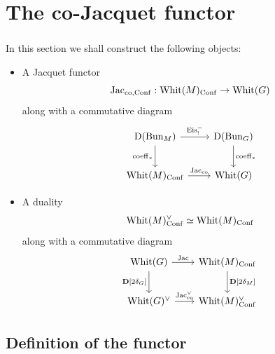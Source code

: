 \section{The co-Jacquet functor}
\label{section:co_Jac}

\subsubsection{} In this section we shall construct the following objects:
\begin{itemize}
    \item A Jacquet functor
        \[\mathrm{Jac}_{\mathrm{co},\mathrm{Conf}} : \mathrm{Whit}(M)_{\mathrm{Conf}} \to \mathrm{Whit}(G)\]
    along with a commutative diagram
        \begin{equation}
        \label{eqn:coeff_Eis_Conf}
        \begin{tikzcd}[
          column sep={8em,between origins},
          row sep={4em,between origins}
        ]
          \DMod(\Bun_M) \arrow[r, "\Eis_!^-"] \arrow[d, "\coeff_*" left] & \DMod(\Bun_G) \arrow[d, "\coeff_*"] \\
          \Whit(M)_\Conf \arrow[r, "\Jac_{\co}"] & \Whit(G)
        \end{tikzcd}
        \end{equation}
    \item A duality
        \[\mathrm{Whit}(M)_{\mathrm{Conf}}^\vee \simeq \mathrm{Whit}(M)_{\mathrm{Conf}}\]
    along with a commutative diagram
        \begin{equation}
        \label{eqn:Jac_duality_Conf}
        \begin{tikzcd}[
          column sep={8em,between origins},
          row sep={4em,between origins}
        ]
          \Whit(G) \arrow[r, "\Jac"] \arrow[d, "\DD{[2 \delta_G]}" left] & \Whit(M)_\Conf \arrow[d, "\DD{[2\delta_M]}"] \\
          \Whit(G)^\vee \arrow[r, "\Jac_{\co}^\vee"] & \Whit(M)_\Conf^\vee 
        \end{tikzcd}
        \end{equation}
\end{itemize}

\subsection{Definition of the functor}

